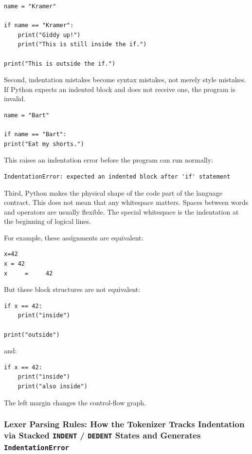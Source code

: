 \begin{verbatim}
name = "Kramer"

if name == "Kramer":
    print("Giddy up!")
    print("This is still inside the if.")

print("This is outside the if.")
\end{verbatim}

Second, indentation mistakes become syntax mistakes, not merely style mistakes. If Python expects an indented block and does not receive one, the program is invalid.

\begin{verbatim}
name = "Bart"

if name == "Bart":
print("Eat my shorts.")
\end{verbatim}

This raises an indentation error before the program can run normally:

\begin{verbatim}
IndentationError: expected an indented block after 'if' statement
\end{verbatim}

Third, Python makes the physical shape of the code part of the language contract. This does not mean that any whitespace matters. Spaces between words and operators are usually flexible. The special whitespace is the indentation at the beginning of logical lines.

For example, these assignments are equivalent:

\begin{verbatim}
x=42
x = 42
x     =     42
\end{verbatim}

But these block structures are not equivalent:

\begin{verbatim}
if x == 42:
    print("inside")

print("outside")
\end{verbatim}

and:

\begin{verbatim}
if x == 42:
    print("inside")
    print("also inside")
\end{verbatim}

The left margin changes the control-flow graph.

\subsubsection{Lexer Parsing Rules: How the Tokenizer Tracks Indentation via Stacked \texttt{INDENT} / \texttt{DEDENT} States and Generates \texttt{IndentationError}}

